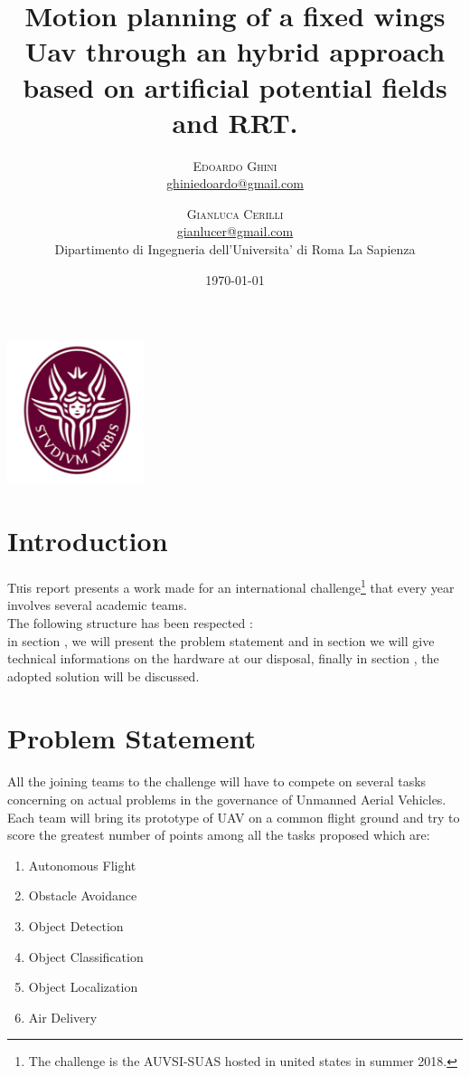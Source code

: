 \documentclass[oneside,onecolumn]{article}
\title{Motion planning of a fixed wings Uav through an hybrid approach based on artificial potential
  fields and RRT. } %
\author{%
  \textsc{Edoardo Ghini} \\[1ex] %
  \normalsize \href{mailto:ghiniedoardo@gmail.com}{ghiniedoardo@gmail.com} %
  \and %
  \textsc{Gianluca Cerilli} \\[1ex] %
  \normalsize \href{mailto:gianlucer@gmail.com}{gianlucer@gmail.com}\\ %
  \normalsize Dipartimento di Ingegneria dell'Universita' di Roma La Sapienza\\
}
\date{\today} %
\begin{document}
\maketitle
\bigskip
\bigskip
\bigskip
\bigskip
\begin{center}
  \includegraphics[width=0.3\textwidth]{laSapienza}
\end{center}

\newpage
\section{Introduction}

\lettrine[nindent=0em,lines=3]{T}his report presents a work made
for an international challenge\footnote{The challenge is the AUVSI-SUAS hosted
  in united states in summer 2018.} that every year involves several academic teams.\\
The following structure has been respected : \\
in section , we will present the problem statement and in section
 we will give technical informations on the hardware at our disposal,
finally in section , the adopted solution will be discussed.

\section{Problem Statement}
All the joining teams to the challenge will have to compete on several tasks
concerning on actual problems in the governance of Unmanned Aerial Vehicles.\\
Each team will bring its prototype of UAV on a common flight ground and try to
score the greatest number of points among all the tasks proposed which are:
\begin{enumerate}\centering
\item Autonomous Flight
\item Obstacle Avoidance
\item Object Detection
\item Object Classification
\item Object Localization 
\item Air Delivery
\end{enumerate}
\end{document}
